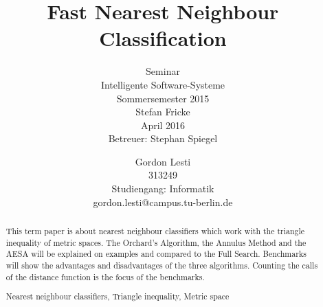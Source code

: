 \documentclass[runningheads,a4paper]{llncs}
\newcommand{\keywords}[1]{\par\addvspace\baselineskip
\noindent\keywordname\enspace\ignorespaces#1}
\begin{document}
\mainmatter

\title{Fast Nearest Neighbour Classification}
\subtitle{\textnormal{\small{Seminar\\
Intelligente Software-Systeme\\
Sommersemester 2015\\\vspace{1\baselineskip}
Stefan Fricke\\\vspace{2\baselineskip}
April 2016\\
Betreuer: Stephan Spiegel\\\vspace{1\baselineskip}}}}


\author{Gordon Lesti\\313249\\Studiengang: Informatik\\gordon.lesti@campus.tu-berlin.de\\\vspace{5\baselineskip}}



\maketitle
{}

\begin{abstract}
This term paper is about nearest neighbour classifiers which work with the triangle inequality of metric spaces. The
Orchard’s Algorithm, the Annulus Method and the AESA will be explained on examples and compared to the Full Search.
Benchmarks will show the advantages and disadvantages of the three algorithms. Counting the calls of the distance
function is the focus of the benchmarks.
\keywords{Nearest neighbour classifiers, Triangle inequality, Metric space}
\end{abstract}
\end{document}
